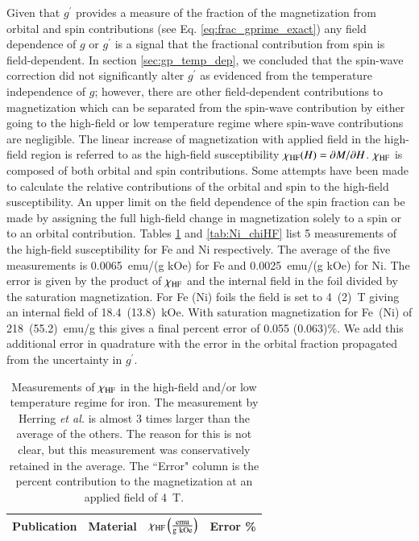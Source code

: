 \documentclass[preprint,12pt]{elsarticle}
\begin{document}
{Given that $g^\prime$ provides a measure of the fraction of the magnetization from orbital and spin contributions (see Eq. \ref{eq:frac_gprime_exact}) any field dependence of $g$ or $g^\prime$ is a signal that the fractional contribution from spin is field-dependent. In section \ref{sec:gp_temp_dep}, we concluded that the spin-wave correction did not significantly alter $g^\prime$ as evidenced from the temperature independence of $g$; however, there are other field-dependent contributions to magnetization which can be separated from the spin-wave contribution by either going to the high-field or low temperature regime where spin-wave contributions are negligible. The linear increase of magnetization with applied field in the high-field region is referred to as the high-field susceptibility $\chi_{\rm HF}(H)=\partial M/\partial H$. $\chi_{\rm HF}$ is composed of both orbital and spin contributions\cite{Herring1966, Stoelinga1966, Foner1969}. Some attempts have been made to calculate the relative contributions of the orbital and spin to the high-field susceptibility\cite{Yasui1971}. An upper limit on the field dependence of the spin fraction can be made by assigning the full high-field change in magnetization solely to a spin or to an orbital contribution.  Tables \ref{tab:Fe_chiHF} and \ref{tab:Ni_chiHF} list 5 measurements of the high-field susceptibility for Fe and Ni respectively. The average of the five measurements is 0.0065~emu/(g kOe) for Fe and 0.0025~emu/(g kOe) for Ni. The error is given by the product of $\chi_{\rm HF}$ and the internal field in the foil divided by the saturation magnetization. For Fe (Ni) foils the field is set to 4~(2)~T giving an internal field of 18.4~(13.8)~kOe. With saturation magnetization for Fe~(Ni) of 218~(55.2)~emu/g this gives a final percent error of 0.055 (0.063)\%. We add this additional error in quadrature with the error in the orbital fraction propagated from the uncertainty in $g^\prime$.
\begin{table}[h]
\caption{\label{tab:Fe_chiHF}Measurements of $\chi_{\rm HF}$ in the high-field and/or low temperature regime for iron. The measurement by Herring {\it et al.} is almost 3 times larger than the average of the others. The reason for this is not clear, but this measurement was conservatively retained in the average. The ``Error" column is the percent contribution to the magnetization at an applied field of 4~T.}
\begin{center}
\begin{tabular}{lccc}\hline
Publication&Material&$\chi_{\rm HF} \left(\frac{\rm emu}{ \rm g~kOe}\right)$&Error \%\\\hline

\end{tabular}
\end{center}
\end{table}}
\end{document}
